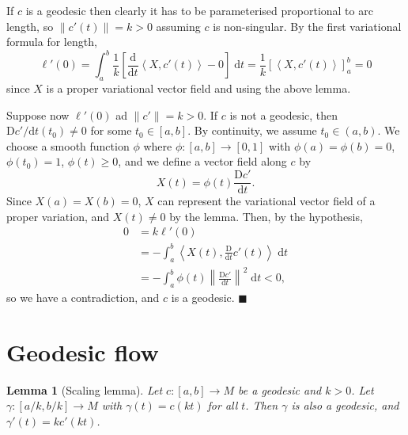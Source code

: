 \documentclass[letter-paper]{tufte-book}
\newtheorem{lemma}[theorem]{\color{pastel-blue}Lemma}
\newenvironment{proof}[1][Proof]{\begin{trivlist}
\item[\hskip \labelsep {\bfseries #1}]}{\end{trivlist}}
\newcommand{\qed}{\hfill$\blacksquare$}
\begin{document}
\begin{proof}
  If $c$ is a geodesic then clearly it has to be parameterised proportional to arc length, so $\|c'(t)\| = k > 0$ assuming $c$ is non-singular. By the first variational formula for length,
  \begin{equation*}
    \ell'(0) = \int_a^b \frac{1}{k}\left[\frac{\mathrm{d}}{\mathrm{d}t} \left\langle X, c'(t) \right\rangle - 0\right] \; \mathrm{d}t = \frac{1}{k}\left[ \left\langle X, c'(t) \right\rangle \right]_a^b = 0
  \end{equation*}
  since $X$ is a proper variational vector field and using the above lemma.
  
  Suppose now $\ell'(0)$ ad $\|c'\| = k > 0$. If $c$ is not a geodesic, then $\mathrm{D}c'/\mathrm{d}t (t_0) \neq 0$ for some $t_0 \in [a,b]$. By continuity, we assume $t_0 \in(a,b)$. We choose a smooth function $\phi$ where $\phi:[a,b] \to [0,1]$ with $\phi(a) = \phi(b) = 0$, $\phi(t_0) = 1$, $\phi(t) \geq 0$, and we define a vector field along $c$ by
  \begin{equation*}
    X(t) = \phi(t) \frac{\mathrm{D}c'}{\mathrm{d}t}.
  \end{equation*}
  Since $X(a) = X(b) = 0$, $X$ can represent the variational vector field of a proper variation, and $X(t) \neq 0$ by the lemma. Then, by the hypothesis,
  \begin{align*}
    0 &= k \ell'(0) \\
      &= -\int_a^b \left\langle X(t), \frac{\mathrm{D}}{\mathrm{d}t}c'(t)\right\rangle \; \mathrm{d}t\\
      &= -\int_a^b \phi(t) \left\| \frac{\mathrm{D}c'}{\mathrm{d}t}\right\|^2\; \mathrm{d}t < 0,
  \end{align*}
  so we have a contradiction, and $c$ is a geodesic. \qed
\end{proof}


\section{Geodesic flow}

\begin{lemma}[Scaling lemma]
  Let $c:[a,b] \to M$ be a geodesic and $k>0$. Let $\gamma: [a/k, b/k] \to M$ with $\gamma(t) = c(kt)$ for all $t$. Then $\gamma$ is also a geodesic, and $\gamma'(t) = kc'(kt)$.
\end{lemma}
\end{document}

